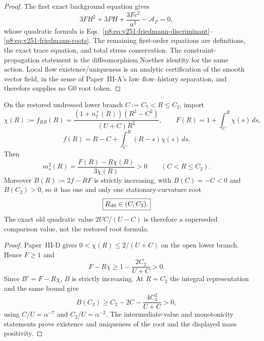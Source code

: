 \documentclass[12pt,a4paper]{article}
\begin{document}
\begin{proof}
The first exact background equation gives
\[
 3FH^2+3PH+\frac{3Fc^2}{a^2}-\mathcal A_F=0,
\]
whose quadratic formula is
Eqs.~\eqref{p8:eq:v251-friedmann-discriminant}--
\eqref{p8:eq:v251-friedmann-roots}.  The remaining first-order equations are
definitions, the exact trace equation, and total stress conservation.  The
constraint-propagation statement is the diffeomorphism Noether identity for
the same action.  Local flow existence/uniqueness is an analytic certification
of the smooth vector field, in the sense of Paper~III-A's law--flow--history
separation, and therefore supplies no G0 root token.
\end{proof}

\begin{theorem}
\label{p8:thm:laur27-lower-desitter-root}
On the restored undressed lower branch $C:=C_7<R\le C_2$, import
\[
 \chi(R):=f_{RR}(R)=
 \frac{(1+n_7^+(R))(R^2-C^2)}{(U+C)R^2},
 \qquad
 F(R)=1+\int_C^R\chi(s)\,ds,
\]
\[
 f(R)=R-C+\int_C^R(R-s)\chi(s)\,ds.
\]
Then
\begin{equation}
\label{p8:eq:laur27-lower-scalaron-mass}
 \boxed{m_s^2(R)=\frac{F(R)-R\chi(R)}{3\chi(R)}>0
 \qquad(C<R\le C_2).}
\end{equation}
Moreover $B(R):=2f-RF$ is strictly increasing, with $B(C)=-C<0$ and
$B(C_2)>0$, so it has one and only one stationary-curvature root
\begin{equation}
\label{p8:eq:laur27-lower-desitter-root}
 \boxed{R_{\rm dS}\in(C,C_2).}
\end{equation}
The exact old quadratic value $2UC/(U-C)$ is therefore a superseded
comparison value, not the restored root formula.
\end{theorem}

\begin{proof}
Paper~III-D gives $0<\chi(R)\le2/(U+C)$ on the open lower branch.  Hence
$F\ge1$ and
\[
 F-R\chi\ge1-\frac{2C_2}{U+C}>0.
\]
Since $B'=F-R\chi$, $B$ is strictly increasing.  At $R=C_2$ the integral
representation and the same bound give
\[
 B(C_2)\ge C_2-2C-\frac{4C_2^2}{U+C}>0,
\]
using $C/U=\alpha^{-7}$ and $C_2/U=\alpha^{-2}$.  The intermediate-value
and monotonicity statements prove existence and uniqueness of the root and
the displayed mass positivity.
\end{proof}
\end{document}

